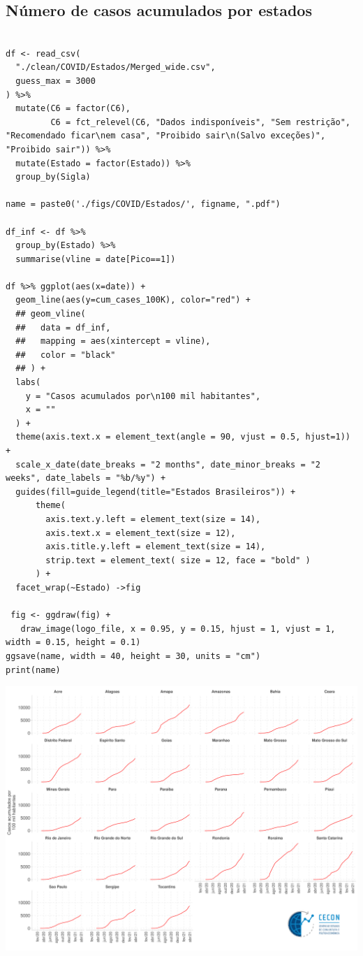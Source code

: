 \documentclass{SelfArx}
\begin{document}
\subsection*{Número de casos acumulados por estados}
\label{sec:org14872cd}

\begin{verbatim}

df <- read_csv(
  "./clean/COVID/Estados/Merged_wide.csv",
  guess_max = 3000
) %>%
  mutate(C6 = factor(C6),
         C6 = fct_relevel(C6, "Dados indisponíveis", "Sem restrição", "Recomendado ficar\nem casa", "Proibido sair\n(Salvo exceções)", "Proibido sair")) %>%
  mutate(Estado = factor(Estado)) %>%
  group_by(Sigla)

name = paste0('./figs/COVID/Estados/', figname, ".pdf")

df_inf <- df %>%
  group_by(Estado) %>%
  summarise(vline = date[Pico==1])

df %>% ggplot(aes(x=date)) +
  geom_line(aes(y=cum_cases_100K), color="red") +
  ## geom_vline(
  ##   data = df_inf,
  ##   mapping = aes(xintercept = vline),
  ##   color = "black"
  ## ) +
  labs(
    y = "Casos acumulados por\n100 mil habitantes",
    x = ""
  ) +
  theme(axis.text.x = element_text(angle = 90, vjust = 0.5, hjust=1)) +
  scale_x_date(date_breaks = "2 months", date_minor_breaks = "2 weeks", date_labels = "%b/%y") +
  guides(fill=guide_legend(title="Estados Brasileiros")) +
      theme(
        axis.text.y.left = element_text(size = 14),
        axis.text.x = element_text(size = 12),
        axis.title.y.left = element_text(size = 14),
        strip.text = element_text( size = 12, face = "bold" )
      ) +
  facet_wrap(~Estado) ->fig

 fig <- ggdraw(fig) +
   draw_image(logo_file, x = 0.95, y = 0.15, hjust = 1, vjust = 1, width = 0.15, height = 0.1)
ggsave(name, width = 40, height = 30, units = "cm")
print(name)
\end{verbatim}

\begin{center}
\includegraphics[width=.9\linewidth]{./figs/COVID/Estados/Casos_Cum.pdf}
\end{center}
\end{document}
